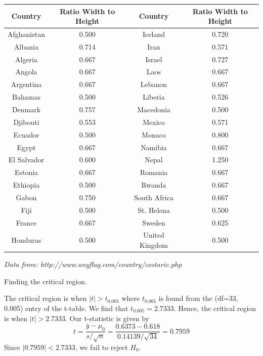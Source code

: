 \documentclass{article}
\begin{document}
\begin{probset}
\begin{prob}[\textbf{7.4.20}]
    \begin{center}
        \begin{tabular}{cccc}
            \hline
            Country & Ratio Width to Height & Country & Ratio Width to Height \\
            \hline
            Afghanistan & 0.500 & Iceland & 0.720 \\
            Albania & 0.714 & Iran & 0.571 \\
            Algeria & 0.667 & Israel & 0.727 \\
            Angola & 0.667 & Laos & 0.667 \\
            Argentina & 0.667 & Lebanon & 0.667 \\
            Bahamas & 0.500 & Liberia & 0.526 \\
            Denmark & 0.757 & Macedonia & 0.500 \\
            Djibouti & 0.553 & Mexico & 0.571 \\
            Ecuador & 0.500 & Monaco & 0.800 \\
            Egypt & 0.667 & Namibia & 0.667 \\
            El Salvador & 0.600 & Nepal & 1.250 \\
            Estonia & 0.667 & Romania & 0.667 \\
            Ethiopia & 0.500 & Rwanda & 0.667 \\
            Gabon & 0.750 & South Africa & 0.667 \\
            Fiji & 0.500 & St. Helena & 0.500 \\
            France & 0.667 & Sweden & 0.625 \\
            Honduras & 0.500 & United Kingdom & 0.500 \\
            \hline
        \end{tabular}
    \end{center}
    \textit{Data from: http://www.anyflag.com/country/costaric.php}

    \begin{subprobset}
    \begin{subprob}
        Finding the critical region.

        \begin{soln}
            The critical region is when $|t| > t_{0.005}$ where $t_{0.005}$ is found from the (df=33, 0.005) entry of the t-table. We find that $t_{0.005} = 2.7333$. Hence, the critical region is when $|t| > 2.7333$. Our t-statistic is given by
            \[
                t = \frac{\bar{y} - \mu_0}{s/\sqrt{n}} = \frac{0.6373 - 0.618}{0.14139/\sqrt{34}} = 0.7959
            \]
            Since $|0.7959| < 2.7333$, we fail to reject $H_0$.
        \end{soln}
    \end{subprob}


\end{subprobset}
\end{prob}
\end{probset}
\end{document}
